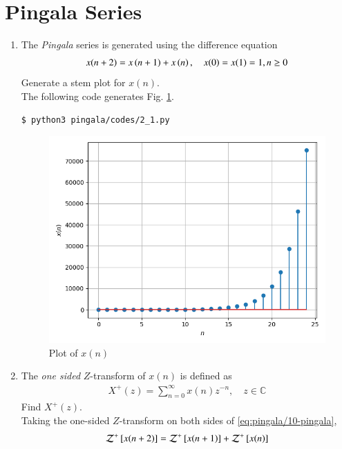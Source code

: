 \documentclass[journal,12pt,twocolumn]{IEEEtran}
\renewcommand\thesection{\arabic{section}}
\begin{document}
\section{Pingala Series}
\begin{enumerate}[label=\thesection.\arabic*,ref=\thesection.\theenumi]
	\item The {\em Pingala} series is generated using the difference equation 
\begin{align}
	x(n+2) = x\brak{n+1} + x\brak{n},  \quad x(0) = x(1) = 1, n \ge 0
	\label{eq:pingala/10-pingala}
\end{align}
Generate a stem plot for $x(n)$.
\\
\solution
The following code generates
    Fig. \ref{fig:pingala/xn}.
\begin{lstlisting}
$ python3 pingala/codes/2_1.py
\end{lstlisting}
\begin{figure}[!htp]
    \includegraphics[width=\columnwidth]{pingala/figs/2_1.png}
    \caption{Plot of $x(n)$}
    \label{fig:pingala/xn}
\end{figure}
\item The {\em one sided} $Z$-transform of $x(n)$ is defined as 
\begin{align}
	X^{+}(z) = \sum_{n = 0}^{\infty}x(n)z^{-n}, \quad z \in \mathbb{C}
\label{eq:pingala/one-Z}
\end{align}
Find $X^{+}(z)$.
\\
\solution Taking the one-sided $Z$-transform on both sides of \eqref{eq:pingala/10-pingala},
\begin{align}
	\mathcal{Z}^+\sbrak{x(n + 2)} &= \mathcal{Z}^+\sbrak{x(n + 1)} + \mathcal{Z}^+\sbrak{x(n)} \\

\end{align}
\end{enumerate}
\end{document}
